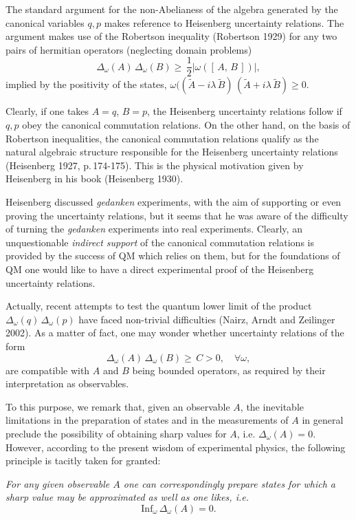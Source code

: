 \documentclass[12pt]{article}
\def \be {\begin{equation}}
\def \ee {\end{equation}}
\def \ume {{\scriptstyle{\frac{1}{2}}}}
\def \l {{\lambda}}
\def \om {{\omega}}
\begin{document}
The standard argument for the non-Abelianess of the algebra generated by the canonical variables $q, p$ makes reference to Heisenberg uncertainty relations. 
The argument  
makes use of the Robertson inequality (Robertson 1929) for any two pairs of hermitian operators (neglecting domain problems) \be{\Delta_\om(A)\,\Delta_\om(B) \geq \,\ume |\om([\,A,\,B\,])|,}\ee implied by  the positivity of the states, $\om((\tilde{A} - i \l\,\tilde{B})\,( \tilde{A} + i \l\,\tilde{B}) \geq 0$. 

Clearly, if one takes $A = q$, $B = p$, the Heisenberg uncertainty relations follow if $q, p$ obey the canonical commutation relations. 
On the other hand, on the basis of Robertson inequalities, the canonical commutation relations qualify as the natural algebraic structure responsible  for the Heisenberg uncertainty relations (Heisenberg 1927, p.\,174-175). This is the physical motivation given by Heisenberg in his book (Heisenberg 1930).

 Heisenberg discussed {\em gedanken} experiments, with the aim of  supporting or even proving the uncertainty  relations, but it seems that he was aware of the difficulty of turning the {\em gedanken} experiments into real experiments. Clearly,  an unquestionable {\em indirect support} of the canonical commutation relations  is provided by the success of QM which relies on them, but for the foundations of QM one would like to have a direct experimental proof of the Heisenberg uncertainty relations.


Actually, recent attempts to test the quantum lower limit of the product $\Delta_\omega(q)\,\Delta_\omega(p)$ have faced non-trivial difficulties (Nairz, Arndt and Zeilinger 2002). As a matter of fact, one may wonder whether  uncertainty relations of the form \be {\Delta_\om(A)\,\Delta_\om(B) \geq \,C > 0,\,\,\,\,\,\,\forall \om, }\ee  are   compatible with $A$ and $B$ being bounded operators, as required  by their interpretation as observables. 

To this purpose, we remark that, 
given an observable $A$, the inevitable limitations in the preparation of states  and in the measurements of $A$  in general preclude the possibility of obtaining sharp values for $A$, i.e. $\Delta_\omega(A) = 0$. However, according to the present wisdom  of experimental physics, the following principle  is tacitly taken for granted: 
\vspace{2mm}

 {\em For any  given observable $A$ one can correspondingly  prepare states for which a sharp value may be approximated as well as one likes, i.e.} \be{ \mbox{Inf}_\om \,\Delta_\om(A) = 0.}\ee 
\end{document}
